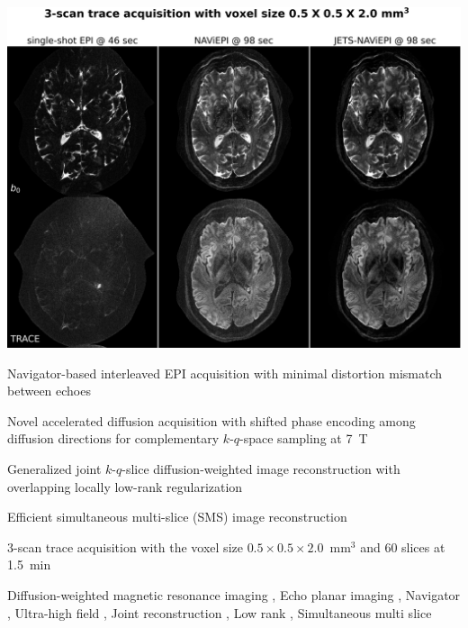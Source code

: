 \documentclass[preprint,12pt,authoryear,review]{elsarticle}
\begin{document}
\begin{frontmatter}
        \begin{graphicalabstract}
            \includegraphics[width=\linewidth]{../figures/graph.png}
        \end{graphicalabstract}

        \begin{highlights}
            \item Navigator-based interleaved EPI acquisition with
            minimal distortion mismatch between echoes

            \item Novel accelerated diffusion acquisition
            with shifted phase encoding among diffusion directions
            for complementary $k$-$q$-space sampling at \SI{7}{\tesla}

            \item Generalized joint $k$-$q$-slice
            diffusion-weighted image reconstruction
            with overlapping locally low-rank regularization

            \item Efficient simultaneous multi-slice (SMS)
            image reconstruction

            \item 3-scan trace acquisition with the voxel size
            $0.5\times0.5\times2.0$~mm$^3$ and 60 slices
            at \SI{1.5}{\minute}
        \end{highlights}

        \begin{keyword}
            Diffusion-weighted magnetic resonance imaging \sep
            Echo planar imaging \sep
            Navigator \sep
            Ultra-high field \sep
            Joint reconstruction \sep
            Low rank \sep
            Simultaneous multi slice
        \end{keyword}

    \end{frontmatter}
\end{document}

